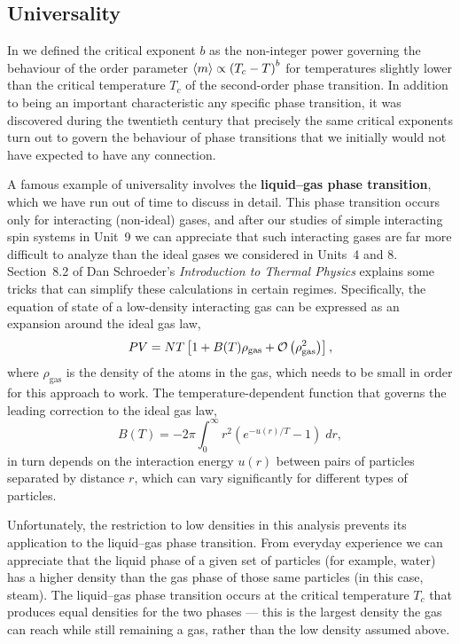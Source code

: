 \subsection{Universality}
In  we defined the critical exponent $b$ as the non-integer power governing the behaviour of the order parameter $\left\langle m \right\rangle \propto \left(T_c - T\right)^b$ for temperatures slightly lower than the critical temperature $T_c$ of the second-order phase transition.
In addition to being an important characteristic any specific phase transition, it was discovered during the twentieth century that precisely the same critical exponents turn out to govern the behaviour of phase transitions that we initially would not have expected to have any connection.

A famous example of universality involves the \textbf{liquid--gas phase transition}, which we have run out of time to discuss in detail.
This phase transition occurs only for interacting (non-ideal) gases, and after our studies of simple interacting spin systems in Unit~9 we can appreciate that such interacting gases are far more difficult to analyze than the ideal gases we considered in Units~4 and 8.
Section~8.2 of Dan Schroeder's \textit{Introduction to Thermal Physics} explains some tricks that can simplify these calculations in certain regimes.
Specifically, the equation of state of a low-density interacting gas can be expressed as an expansion around the ideal gas law,
\begin{equation*}
  PV = NT\left[1 + B(T) \rho_{\text{gas}} + \mathcal O\left(\rho_{\text{gas}}^2\right)\right],
\end{equation*}
where $\rho_{\text{gas}}$ is the density of the atoms in the gas, which needs to be small in order for this approach to work.
The temperature-dependent function that governs the leading correction to the ideal gas law,
\begin{equation*}
  B(T) = -2\pi \int_0^{\infty} r^2 \left(e^{-u(r) / T} - 1\right) \; dr,
\end{equation*}
in turn depends on the interaction energy $u(r)$ between pairs of particles separated by distance $r$, which can vary significantly for different types of particles.

Unfortunately, the restriction to low densities in this analysis prevents its application to the liquid--gas phase transition.
From everyday experience we can appreciate that the liquid phase of a given set of particles (for example, water) has a higher density than the gas phase of those same particles (in this case, steam).
The liquid--gas phase transition occurs at the critical temperature $T_c$ that produces equal densities for the two phases --- this is the largest density the gas can reach while still remaining a gas, rather than the low density assumed above.

